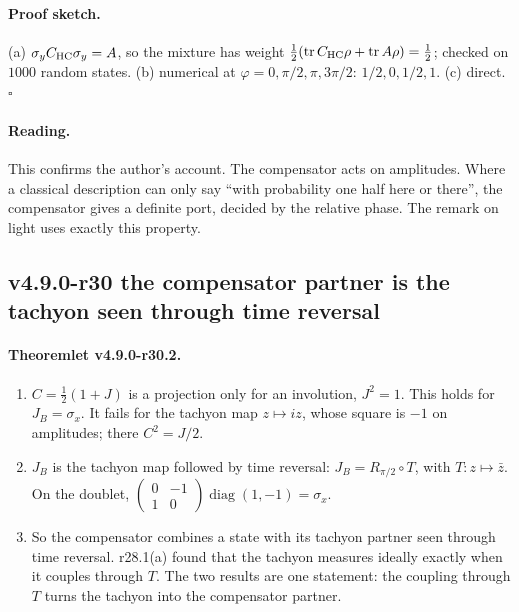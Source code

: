 \paragraph{Proof sketch.}
(a) \(\sigma_yC_{\mathrm{HC}}\sigma_y=A\), so the mixture has weight \(\tfrac12(\operatorname{tr}C_{\mathrm{HC}}\rho+\operatorname{tr}A\rho)=\tfrac12\); checked on \(1000\)
random states.  (b) numerical at \(\varphi=0,\pi/2,\pi,3\pi/2\): \(1/2,0,1/2,1\).  (c) direct.  \(\square\)

\paragraph{Reading.}
This confirms the author's account.  The compensator acts on amplitudes.  Where a classical description can only say ``with
probability one half here or there'', the compensator gives a definite port, decided by the relative phase.  The remark on light
uses exactly this property.

\subsection*{v4.9.0-r30 the compensator partner is the tachyon seen through time reversal}
\label{subsec:v490-r30-partner}

\paragraph{Theoremlet v4.9.0-r30.2.}
\begin{enumerate}[leftmargin=2em]
\item[(a)] \(C=\tfrac12(1+J)\) is a projection only for an involution, \(J^2=1\).  This holds for \(J_B=\sigma_x\).  It fails for the tachyon map
\(z\mapsto iz\), whose square is \(-1\) on amplitudes; there \(C^2=J/2\).
\item[(b)] \(J_B\) is the tachyon map followed by time reversal: \(J_B=R_{\pi/2}\circ T\), with \(T\colon z\mapsto\bar z\).  On the doublet,
\(\left(\begin{smallmatrix}0&-1\\1&0\end{smallmatrix}\right)\operatorname{diag}(1,-1)=\sigma_x\).
\item[(c)] So the compensator combines a state with its tachyon partner seen through time reversal.  r28.1(a) found that the tachyon
measures ideally exactly when it couples through \(T\).  The two results are one statement: the coupling through \(T\) turns the
tachyon into the compensator partner.
\end{enumerate}


